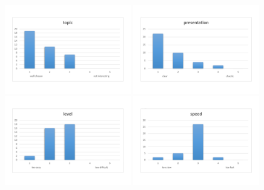 \documentclass[11pt,a4paper]{article}
\begin{document}
\begin{figure}[H]
\centering
\null\hfill %
{\includegraphics[width=0.49\textwidth]{topic.pdf}}
\hfill %
{\includegraphics[width=0.49\textwidth]{presentation.pdf}}
\hfill %
{\includegraphics[width=0.49\textwidth]{level.pdf}}
\hfill %
{\includegraphics[width=0.49\textwidth]{speed.pdf}}
\hfill\null %
\end{figure} 
\end{document}
